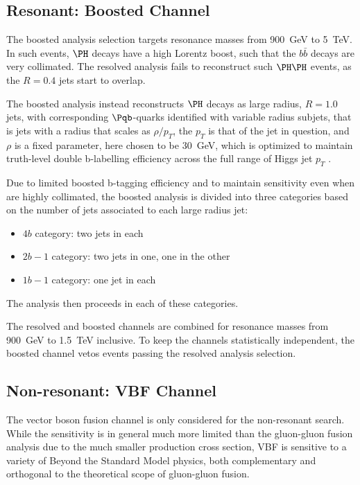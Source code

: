 \subsection{Resonant: Boosted Channel}
The boosted analysis selection targets resonance masses from \SI{900}{\GeV} to \SI{5}{\TeV}.
In such events, $\higgs$ decays have a high Lorentz boost, such that the $b\bar{b}$ decays are
very collimated. The resolved analysis fails to reconstruct such $\higgs\higgs$ events, as the 
$R=0.4$ jets start to overlap. 

The boosted analysis instead reconstructs $\higgs$ decays as large radius, $R=1.0$ jets, with 
corresponding $\Pqb$-quarks identified with variable radius subjets, that is jets with a 
radius that scales as $\rho / p_{T}$, the $p_{T}$ is that of the jet in question, and
$\rho$ is a fixed parameter, here chosen to be \SI{30}{\GeV}, which is optimized to maintain 
truth-level double b-labelling efficiency across the full range of Higgs jet $p_{T}$ 
.

Due to limited boosted b-tagging efficiency  and to maintain sensitivity 
even when \bjets are highly collimated, the boosted analysis is divided into three categories 
based on the number of \btagged jets associated to each large radius jet:
\begin{itemize}
	\item $4b$ category: two \btagged jets in each
	\item $2b-1$ category: two \btagged jets in one, one in the other
	\item $1b-1$ category: one \btagged jet in each
\end{itemize} 

The analysis then proceeds in each of these categories.

The resolved and boosted channels are combined for resonance masses from \SI{900}{\GeV} 
to \SI{1.5}{\TeV} inclusive. To keep the channels statistically independent, the boosted channel 
vetos events passing the resolved analysis selection.


\subsection{Non-resonant: VBF Channel} 
The vector boson fusion channel is only considered for the non-resonant search. While the 
sensitivity is in general much more limited than the gluon-gluon fusion analysis due to the 
much smaller production cross section, VBF is sensitive to a variety of Beyond the Standard 
Model physics, both complementary and orthogonal to the theoretical scope of gluon-gluon fusion. 

